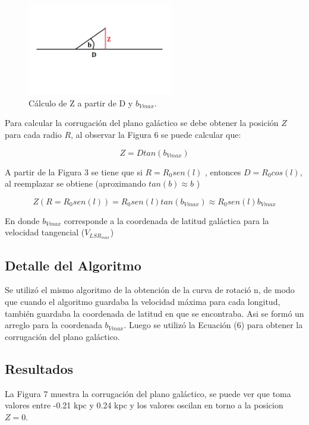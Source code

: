 \documentclass[letterpaper,oneside]{article}
\begin{document}
\begin{figure}
  \centering
  \includegraphics[height=4cm]{../graficos/imagenes/Corrugacion.jpg}
  \caption{Cálculo de Z a partir de D y $b_{Vmax}$.}
\end{figure}

Para calcular la corrugación del plano galáctico se debe obtener la posición $Z$ para cada radio $R$, al observar la Figura 6 se puede calcular que:

$$Z = D tan(b_{Vmax})$$

A partir de la Figura 3 se tiene que si $R = R_0 sen(l)$ , entonces $D = R_0 cos(l)$, al reemplazar se obtiene (aproximando $tan(b) \approx b $ )

\begin{equation}
    Z(R=R_0 sen(l)) = R_0 sen(l) tan(b_{Vmax}) \approx R_0 sen(l) b_{Vmax}
\end{equation}

En donde $b_{Vmax}$ corresponde a la coordenada de latitud galáctica para la velocidad tangencial ($V_{LSR}_{max}$)

\subsection{Detalle del Algoritmo}
Se utilizó el mismo algoritmo de la obtención de la curva de rotació
n, de modo que cuando el algoritmo guardaba la velocidad máxima para cada longitud, también guardaba la coordenada de latitud en que se encontraba. Asi se formó un arreglo para la coordenada $b_{Vmax}$. Luego se utilizó la Ecuación (6) para obtener la corrugación del plano galáctico.

\subsection{Resultados}
La Figura 7 muestra la corrugación del plano galáctico, se puede ver que toma valores entre -0.21 kpc y 0.24 kpc y los valores oscilan en torno a la posicion $Z=0$.
\end{document}
